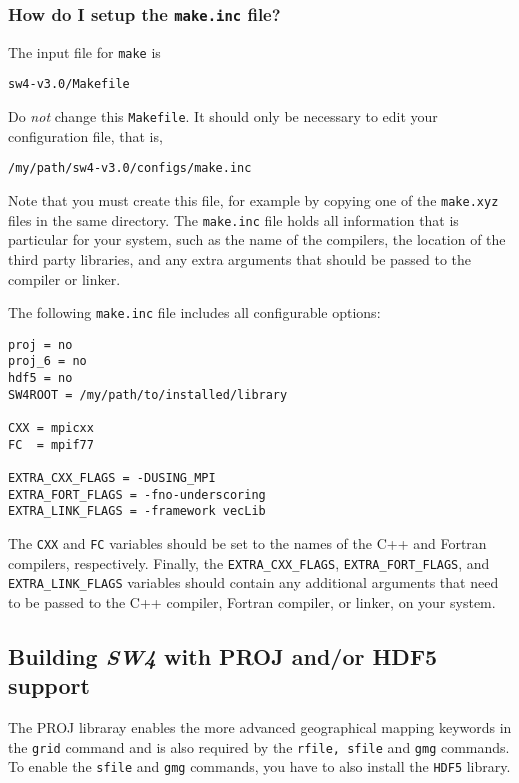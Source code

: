 \documentclass[11pt]{article}
\begin{document}
\subsubsection{How do I setup the {\tt make.inc} file?}

The input file for \verb+make+ is
\begin{verbatim}
sw4-v3.0/Makefile
\end{verbatim}
Do {\em not} change this \verb+Makefile+. It should only be necessary to edit your configuration
file, that is,
\begin{verbatim}
/my/path/sw4-v3.0/configs/make.inc
\end{verbatim}
Note that you must create this file, for example by copying one of the \verb+make.xyz+ files in the
same directory. The \verb+make.inc+ file holds all information that is particular for your system,
such as the name of the compilers, the location of the third party libraries, and any extra
arguments that should be passed to the compiler or linker. 

The following \verb+make.inc+ file includes all configurable options:
\begin{verbatim}
proj = no
proj_6 = no
hdf5 = no
SW4ROOT = /my/path/to/installed/library

CXX = mpicxx
FC  = mpif77

EXTRA_CXX_FLAGS = -DUSING_MPI
EXTRA_FORT_FLAGS = -fno-underscoring
EXTRA_LINK_FLAGS = -framework vecLib
\end{verbatim}
The \verb+CXX+ and \verb+FC+ variables should be set to the names of the C++ and
Fortran compilers, respectively. Finally, the \verb+EXTRA_CXX_FLAGS+, \verb+EXTRA_FORT_FLAGS+, and
\verb+EXTRA_LINK_FLAGS+ variables should contain any additional arguments that need to be passed to
the C++ compiler, Fortran compiler, or linker, on your system.

\subsection{Building \emph{SW4} with PROJ and/or HDF5 support}
The PROJ libraray enables the more advanced geographical mapping keywords in the {\tt grid} command and is also required by the {\tt rfile, sfile} and {\tt gmg} commands. To enable the {\tt sfile} and {\tt gmg} commands, you have to also install the {\tt HDF5} library. 
\end{document}
